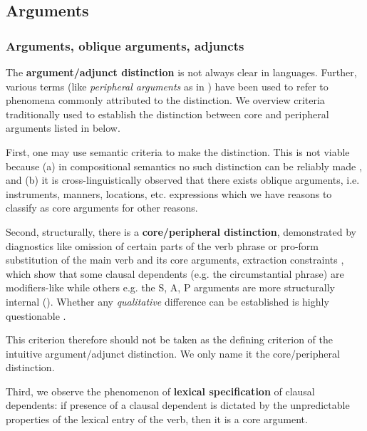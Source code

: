 \documentclass[a4paper, oneside, 12pt]{report}
\newcommand*{\citepage}[1]{p.~{#1}}
\newcommand*{\citepages}[1]{pp.~{#1}}
\newcommand*{\concept}[1]{\textbf{#1}}
\newcommand*{\term}[1]{\emph{#1}}
\begin{document}
\subsection{Arguments}\label{sec:grammatical.clause.argument}

\subsubsection{Arguments, oblique arguments, adjuncts}\label{sec:grammatical.clause.peripheral.distinction}

The \concept{argument/adjunct distinction} is not always clear in languages.
Further, various terms (like \term{peripheral arguments} as in \citet{dixon2009basic1}) have been used to refer to phenomena commonly attributed to the distinction.
We overview criteria traditionally used to establish the distinction between core and peripheral arguments listed in \citet{mcinnerney2022argument} below.

First, one may use semantic criteria to make the distinction.
This is not viable because (a) in compositional semantics no such distinction can be reliably made \citep[\citepages{24-27}]{mcinnerney2022argument}, and (b) it is cross-linguistically observed that there exists oblique arguments, i.e. instruments, manners, locations, etc. expressions which we have reasons to classify as core arguments for other reasons.

Second, structurally, there is a \concept{core/peripheral distinction},
demonstrated by diagnostics like omission of certain parts of the verb phrase or pro-form substitution of the main verb and its core arguments, extraction constraints \citep[\citepages{106-108}]{mcinnerney2022argument}, which show that some clausal dependents (e.g. the circumstantial phrase) are modifiers-like while others e.g. the S, A, P arguments are more structurally internal (\citealt[\citepage{29}]{cinque1999adverbs}).
Whether any \emph{qualitative} difference can be established is highly questionable \citep[\citepages{128,212}]{mcinnerney2022argument}.

This criterion therefore should not be taken as the defining criterion of the intuitive argument/adjunct distinction.
We only name it the core/peripheral distinction.

Third, we observe the phenomenon of \concept{lexical specification} of clausal dependents:
if presence of a clausal dependent is dictated by the unpredictable properties of the lexical entry of the verb, then it is a core argument.
\end{document}
